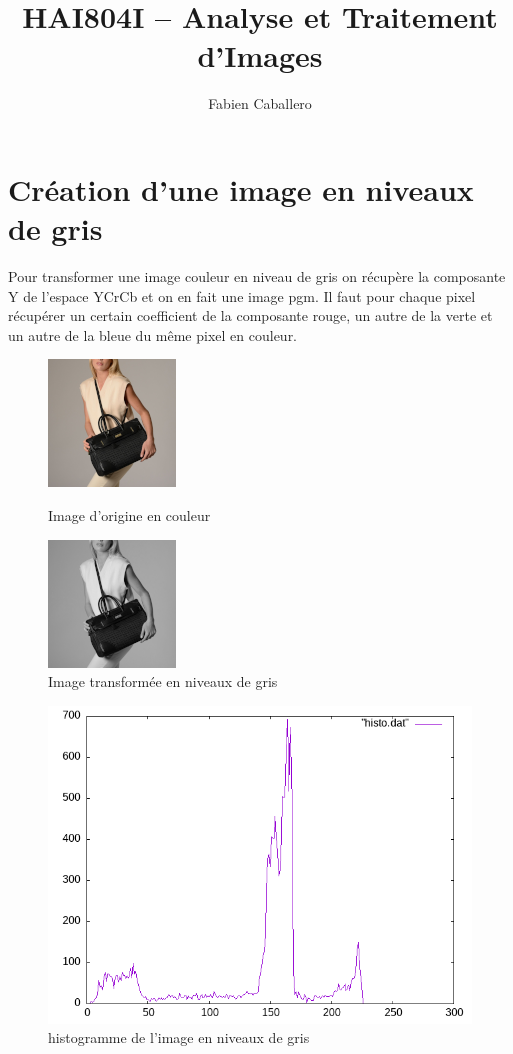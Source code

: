 \documentclass{article}
\title{HAI804I – Analyse et Traitement d'Images}
\author{Fabien Caballero }
\begin{document}
  

\maketitle
    \tableofcontents

\newpage

\section{Création d'une image en niveaux de gris}
Pour transformer une image couleur en niveau de gris on récupère la composante Y de l'espace YCrCb et on en fait une image pgm.
Il faut pour chaque pixel récupérer un certain coefficient de la composante rouge, un autre de la verte et un autre de la bleue du même pixel en couleur.

\begin{figure}[h!]
\centerline{\includegraphics[scale=1.]{./rendus/sac.png}}
\caption{Image d'origine en couleur}

\qquad

\centerline{\includegraphics[scale=1.]{./rendus/sacgris.png}}
\caption{Image transformée en niveaux de gris}
\end{figure}

\begin{figure}[h!]
\centerline{\includegraphics[scale=0.5]{./rendus/histogris.png}}
\caption{histogramme de l'image en niveaux de gris}

\end{figure}
\end{document}
